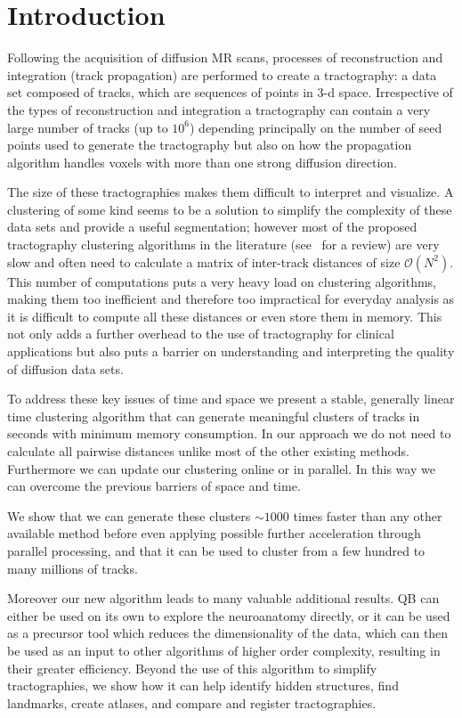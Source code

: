 \documentclass[preprint,authoryear,a4paper,10pt,onecolumn]{elsarticle}
\begin{document}
\section{Introduction}

Following the acquisition of diffusion MR scans, processes of
reconstruction and integration (track propagation) are performed to
create a tractography: a data set composed of tracks, which are
sequences of points in 3-d space. Irrespective of the types of
reconstruction and integration a tractography can contain a very large
number of tracks (up to $10^6$) depending principally on the number of
seed points used to generate the tractography but also on how the
propagation algorithm handles voxels with more than one strong diffusion
direction.

The size of these tractographies makes them difficult to interpret and
visualize. A clustering of some kind seems to be a solution to simplify
the complexity of these data sets and provide a useful segmentation;
however most of the proposed tractography clustering algorithms in the
literature (see~\citet{Garyfallidis_thesis} for a review) are very slow
and often need to calculate a matrix of inter-track distances of size
$\mathcal{O}(N^2)$. This number of computations puts a very heavy load
on clustering algorithms, making them too inefficient and therefore too
impractical for everyday analysis as it is difficult to compute all
these distances or even store them in memory. This not only adds a
further overhead to the use of tractography for clinical applications
but also puts a barrier on understanding and interpreting the quality of
diffusion data sets.

To address these key issues of time and space we present a stable,
generally linear time clustering algorithm that can generate meaningful
clusters of tracks in seconds with minimum memory consumption. In our
approach we do not need to calculate all pairwise distances unlike most
of the other existing methods. Furthermore we can update our clustering
online or in parallel. In this way we can overcome the previous barriers
of space and time.

We show that we can generate these clusters $\sim1000$ times faster than
any other available method before even applying possible further
acceleration through parallel processing, and that it can be used to
cluster from a few hundred to many millions of tracks.

Moreover our new algorithm leads to many valuable additional results. QB
can either be used on its own to explore the neuroanatomy directly, or
it can be used as a precursor tool which reduces the dimensionality of
the data, which can then be used as an input to other algorithms of
higher order complexity, resulting in their greater efficiency. Beyond
the use of this algorithm to simplify tractographies, we show how it can
help identify hidden structures, find landmarks, create atlases, and
compare and register tractographies.
\end{document}

